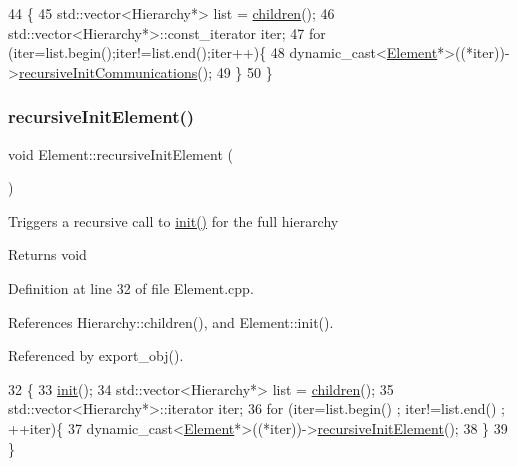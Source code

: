 \begin{DoxyCode}
44                                          \{
45   std::vector<Hierarchy*> list = \hyperlink{classHierarchy_aa9a76f69e98e052ee1a6e32cea006288}{children}();
46   std::vector<Hierarchy*>::const\_iterator iter;
47   \textcolor{keywordflow}{for} (iter=list.begin();iter!=list.end();iter++)\{
48     \textcolor{keyword}{dynamic\_cast<}\hyperlink{classElement}{Element}*\textcolor{keyword}{>}((*iter))->\hyperlink{classElement_a82119ed37dff76508a2746a853ec35ba}{recursiveInitCommunications}();
49   \}
50 \}
\end{DoxyCode}
\mbox{\label{classElement_a3c0abcb36f8906688bb7e32608df7086}} 
\subsubsection{\texorpdfstring{recursive\+Init\+Element()}{recursiveInitElement()}}
{\footnotesize\ttfamily void Element\+::recursive\+Init\+Element (\begin{DoxyParamCaption}{ }\end{DoxyParamCaption})\hspace{0.3cm}{\ttfamily [inherited]}}

Triggers a recursive call to \hyperlink{classICECALv3_abf7281fad80b80b70c5b13ce66ba3451}{init()} for the full hierarchy

\begin{DoxyReturn}{Returns}
void 
\end{DoxyReturn}


Definition at line 32 of file Element.\+cpp.



References Hierarchy\+::children(), and Element\+::init().



Referenced by export\+\_\+obj().


\begin{DoxyCode}
32                                   \{
33   \hyperlink{classElement_af42754b5cabc198869222725218d695c}{init}();
34   std::vector<Hierarchy*> list = \hyperlink{classHierarchy_aa9a76f69e98e052ee1a6e32cea006288}{children}();
35   std::vector<Hierarchy*>::iterator iter;
36   \textcolor{keywordflow}{for} (iter=list.begin() ; iter!=list.end() ; ++iter)\{
37     \textcolor{keyword}{dynamic\_cast<}\hyperlink{classElement}{Element}*\textcolor{keyword}{>}((*iter))->\hyperlink{classElement_a3c0abcb36f8906688bb7e32608df7086}{recursiveInitElement}();
38   \}
39 \}
\end{DoxyCode}
\mbox{\label{classAttrib_a7d4ef7e32d93cb287792b87b857e79f3}} 
